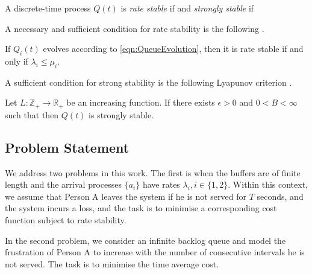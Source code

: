 \documentclass[10pt,a4paper]{article}
\begin{document}
%
%
%



A discrete-time process $Q(t)$ is {\it rate stable} if 
and 
{\it strongly stable} if 

A necessary and sufficient condition for rate stability is the following \cite{neely2010stochastic}.
\begin{thm}
\label{thm:RateStability}
If $Q_i(t)$ evolves according to \eqref{eqn:QueueEvolution}, then it is rate stable if and only if $\lambda_i \leq \mu_i.$
\end{thm}

A sufficient condition for strong stability is the following Lyapunov criterion \cite{kumar2008wireless}.

\begin{thm}
\label{thm:LyapunovStability}
Let $L:\mathbb{Z}_+\to \mathbb{R}_+$ be an increasing function. If there exists  $\epsilon>0$ and $0<B<\infty$ such that  then $Q(t)$ is strongly stable.
\end{thm}


\subsection{Problem Statement}
We address two problems in this work. The first is when the buffers are of finite length and the arrival processes $\{a_i\}$ have rates $\lambda_i, i\in\{1,2\}.$ Within this context, we assume that Person A leaves the system if he is not served for $T$ seconds, and the system incurs a loss, and the task is to minimise a corresponding cost function subject to rate stability.

In the second problem, we consider an infinite backlog queue and model the frustration of Person A to increase with the number of consecutive intervals he is not served. The task is to minimise the time average cost.
\end{document}
